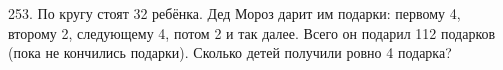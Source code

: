 253. По кругу стоят 32 ребёнка. Дед Мороз дарит им подарки: первому 4, второму 2, следующему 4, потом 2 и так далее. Всего он подарил 112 подарков (пока не кончились подарки). Сколько детей получили ровно 4 подарка?\\
